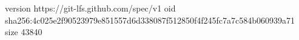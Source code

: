 version https://git-lfs.github.com/spec/v1
oid sha256:4c025e2f90523979e851557d6d338087f512850f4f245fc7a7c584b060939a71
size 43840
